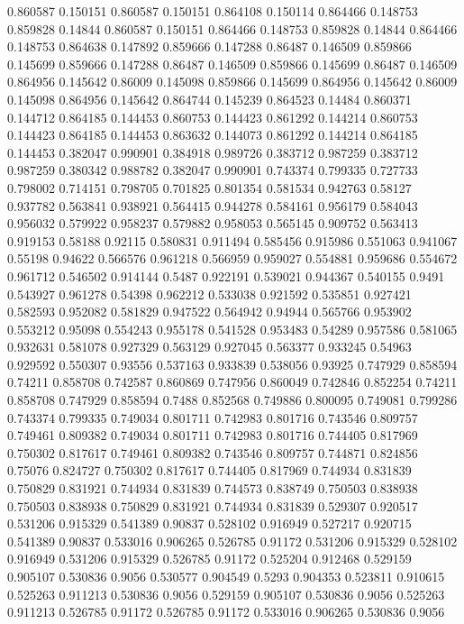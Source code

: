 0.860587 0.150151
0.860587 0.150151
0.864108 0.150114
0.864466 0.148753
0.859828 0.14844
0.860587 0.150151
0.864466 0.148753
0.859828 0.14844
0.864466 0.148753
0.864638 0.147892
0.859666 0.147288
0.86487 0.146509
0.859866 0.145699
0.859666 0.147288
0.86487 0.146509
0.859866 0.145699
0.86487 0.146509
0.864956 0.145642
0.86009 0.145098
0.859866 0.145699
0.864956 0.145642
0.86009 0.145098
0.864956 0.145642
0.864744 0.145239
0.864523 0.14484
0.860371 0.144712
0.864185 0.144453
0.860753 0.144423
0.861292 0.144214
0.860753 0.144423
0.864185 0.144453
0.863632 0.144073
0.861292 0.144214
0.864185 0.144453
0.382047 0.990901
0.384918 0.989726
0.383712 0.987259
0.383712 0.987259
0.380342 0.988782
0.382047 0.990901
0.743374 0.799335
0.727733 0.798002
0.714151 0.798705
0.701825 0.801354
0.581534 0.942763
0.58127 0.937782
0.563841 0.938921
0.564415 0.944278
0.584161 0.956179
0.584043 0.956032
0.579922 0.958237
0.579882 0.958053
0.565145 0.909752
0.563413 0.919153
0.58188 0.92115
0.580831 0.911494
0.585456 0.915986
0.551063 0.941067
0.55198 0.94622
0.566576 0.961218
0.566959 0.959027
0.554881 0.959686
0.554672 0.961712
0.546502 0.914144
0.5487 0.922191
0.539021 0.944367
0.540155 0.9491
0.543927 0.961278
0.54398 0.962212
0.533038 0.921592
0.535851 0.927421
0.582593 0.952082
0.581829 0.947522
0.564942 0.94944
0.565766 0.953902
0.553212 0.95098
0.554243 0.955178
0.541528 0.953483
0.54289 0.957586
0.581065 0.932631
0.581078 0.927329
0.563129 0.927045
0.563377 0.933245
0.54963 0.929592
0.550307 0.93556
0.537163 0.933839
0.538056 0.93925
0.747929 0.858594
0.74211 0.858708
0.742587 0.860869
0.747956 0.860049
0.742846 0.852254
0.74211 0.858708
0.747929 0.858594
0.7488 0.852568
0.749886 0.800095
0.749081 0.799286
0.743374 0.799335
0.749034 0.801711
0.742983 0.801716
0.743546 0.809757
0.749461 0.809382
0.749034 0.801711
0.742983 0.801716
0.744405 0.817969
0.750302 0.817617
0.749461 0.809382
0.743546 0.809757
0.744871 0.824856
0.75076 0.824727
0.750302 0.817617
0.744405 0.817969
0.744934 0.831839
0.750829 0.831921
0.744934 0.831839
0.744573 0.838749
0.750503 0.838938
0.750503 0.838938
0.750829 0.831921
0.744934 0.831839
0.529307 0.920517
0.531206 0.915329
0.541389 0.90837
0.528102 0.916949
0.527217 0.920715
0.541389 0.90837
0.533016 0.906265
0.526785 0.91172
0.531206 0.915329
0.528102 0.916949
0.531206 0.915329
0.526785 0.91172
0.525204 0.912468
0.529159 0.905107
0.530836 0.9056
0.530577 0.904549
0.5293 0.904353
0.523811 0.910615
0.525263 0.911213
0.530836 0.9056
0.529159 0.905107
0.530836 0.9056
0.525263 0.911213
0.526785 0.91172
0.526785 0.91172
0.533016 0.906265
0.530836 0.9056
